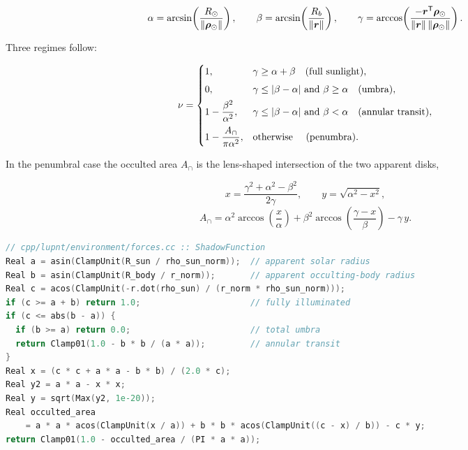 \begin{equation}
  \label{eq:dyn-shadow-angles}
  \alpha = \arcsin\!\left(\frac{R_\odot}{\lVert\bm{\rho}_\odot\rVert}\right),
  \qquad
  \beta = \arcsin\!\left(\frac{R_b}{\lVert\bm{r}\rVert}\right),
  \qquad
  \gamma = \arccos\!\left(\frac{-\bm{r}^{\mathsf{T}}\bm{\rho}_\odot}
                               {\lVert\bm{r}\rVert\,\lVert\bm{\rho}_\odot\rVert}\right).
\end{equation}

Three regimes follow:

\begin{equation}
  \label{eq:dyn-shadow-cases}
  \nu =
  \begin{cases}
    1, & \gamma \ge \alpha+\beta \quad\text{(full sunlight)},\\[4pt]
    0, & \gamma \le |\beta-\alpha| \ \text{and}\ \beta \ge \alpha \quad\text{(umbra)},\\[4pt]
    1 - \dfrac{\beta^2}{\alpha^2}, & \gamma \le |\beta-\alpha| \ \text{and}\ \beta < \alpha \quad\text{(annular transit)},\\[8pt]
    1 - \dfrac{A_\cap}{\pi\alpha^{2}}, & \text{otherwise \quad(penumbra)} .
  \end{cases}
\end{equation}

In the penumbral case the occulted area $A_\cap$ is the lens-shaped intersection
of the two apparent disks,

\begin{equation}
  \label{eq:dyn-shadow-area}
  x = \frac{\gamma^2+\alpha^2-\beta^2}{2\gamma},
  \qquad
  y = \sqrt{\alpha^2-x^2},
\end{equation}
\begin{equation}
  \label{eq:dyn-shadow-lens}
  A_\cap = \alpha^{2}\arccos\!\left(\frac{x}{\alpha}\right)
         + \beta^{2}\arccos\!\left(\frac{\gamma-x}{\beta}\right)
         - \gamma\,y .
\end{equation}

\begin{lstlisting}[language=cpp, caption={Shadow function: apparent radii and the regime tests.}, label={lst:dyn-shadow}]
// cpp/lupnt/environment/forces.cc :: ShadowFunction
Real a = asin(ClampUnit(R_sun / rho_sun_norm));  // apparent solar radius
Real b = asin(ClampUnit(R_body / r_norm));       // apparent occulting-body radius
Real c = acos(ClampUnit(-r.dot(rho_sun) / (r_norm * rho_sun_norm)));
if (c >= a + b) return 1.0;                      // fully illuminated
if (c <= abs(b - a)) {
  if (b >= a) return 0.0;                        // total umbra
  return Clamp01(1.0 - b * b / (a * a));         // annular transit
}
Real x = (c * c + a * a - b * b) / (2.0 * c);
Real y2 = a * a - x * x;
Real y = sqrt(Max(y2, 1e-20));
Real occulted_area
    = a * a * acos(ClampUnit(x / a)) + b * b * acos(ClampUnit((c - x) / b)) - c * y;
return Clamp01(1.0 - occulted_area / (PI * a * a));
\end{lstlisting}

